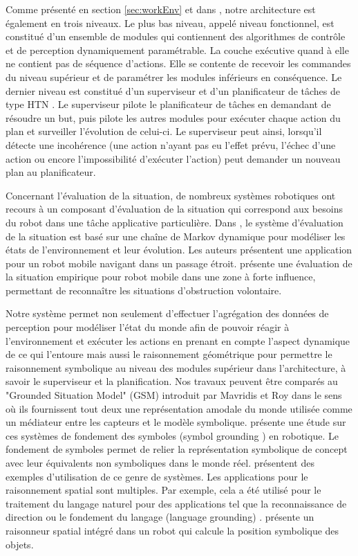\documentclass[a4paper,11pt,twoside]{StyleThese}
\begin{document}
Comme présenté en section \ref{sec:workEnv} et dans \cite{Alami1998}, notre architecture est également en trois niveaux. Le plus bas niveau, appelé niveau fonctionnel, est constitué d'un ensemble de modules qui contiennent des algorithmes de contrôle et de perception dynamiquement paramétrable.
La couche exécutive quand à elle ne contient pas de séquence d'actions. Elle se contente de recevoir les commandes du niveau supérieur et de paramétrer les modules inférieurs en conséquence. Le dernier niveau est constitué d'un superviseur \cite{fioreiser2014} et d'un planificateur de tâches de type HTN \cite{Guitton2012}. Le superviseur pilote le planificateur de tâches en demandant de résoudre un but, puis pilote les autres modules pour exécuter chaque action du plan et surveiller l'évolution de celui-ci.
Le superviseur peut ainsi, lorsqu'il détecte une incohérence (une action n'ayant pas eu l'effet prévu, l'échec d'une action ou encore l'impossibilité d'exécuter l'action) peut demander un nouveau plan au planificateur. 


Concernant l'évaluation de la situation, de nombreux systèmes robotiques ont recours à un composant d'évaluation de la situation qui correspond aux besoins du robot dans une tâche applicative particulière. Dans \cite{beck2011}, le système d'évaluation de la situation est basé sur une chaîne de Markov dynamique pour modéliser les états de l'environnement et leur évolution. Les auteurs présentent une application pour un robot mobile navigant dans un passage étroit.
\cite{Kluge01situationassessment} présente une évaluation de la situation empirique pour robot mobile dans une zone à forte influence, permettant de reconnaître les situations d'obstruction volontaire.

Notre système permet non seulement d'effectuer l'agrégation des données de perception pour modéliser l'état du monde afin de pouvoir réagir à l'environnement et exécuter les actions en prenant en compte l'aspect dynamique de ce qui l'entoure mais aussi le raisonnement géométrique pour permettre le raisonnement symbolique au niveau des modules supérieur dans l'architecture, à savoir le superviseur et la planification.
Nos travaux peuvent être comparés au "Grounded Situation Model" (GSM) introduit par Mavridis et Roy \cite{Mavridis2005} dans le sens où ils fournissent tout deux une représentation amodale du monde utilisée comme un médiateur entre les capteurs et le modèle symbolique. \cite{Coradeschi2013} présente une étude sur ces systèmes de fondement des symboles (symbol grounding \cite{harnad1990symbol}) en robotique.
Le fondement de symboles permet de relier la représentation symbolique de concept avec leur équivalents non symboliques dans le monde réel.
\cite{Daoutis2009} \cite{Lemaignan2011}
présentent des exemples d'utilisation de ce genre de systèmes.
Les applications pour le raisonnement spatial \cite{OKeefe1999} sont multiples. Par exemple, cela a été utilisé pour le traitement du langage naturel pour des applications tel que la reconnaissance de direction \cite{Kollar10,Matuszek10}
ou le fondement du langage (language grounding) \cite{Tellex10}. \cite{Skubic2004} présente un raisonneur spatial intégré dans un robot qui calcule la position symbolique des objets.
\end{document}
